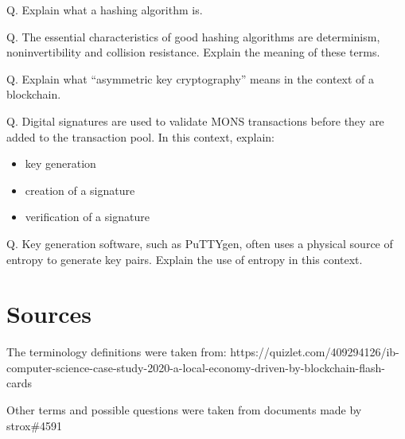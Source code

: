 \documentclass{article}
\begin{document}
Q. Explain what a hashing algorithm is.

Q. The essential characteristics of good hashing algorithms are determinism,
noninvertibility and collision resistance. Explain the meaning of these terms.

Q. Explain what ``asymmetric key cryptography'' means in the context of a
blockchain.

Q. Digital signatures are used to validate MONS transactions before they are
added to the transaction pool. In this context, explain:
\begin{itemize}
    \item key generation
    \item creation of a signature
    \item verification of a signature
\end{itemize}

Q. Key generation software, such as PuTTYgen, often uses a physical source of
entropy to generate key pairs. Explain the use of entropy in this context.

\section{Sources}
The terminology definitions were taken from: https://quizlet.com/409294126/ib-computer-science-case-study-2020-a-local-economy-driven-by-blockchain-flash-cards

Other terms and possible questions were taken from documents made by strox\#4591
\end{document}
